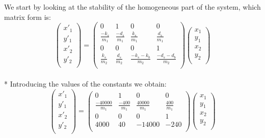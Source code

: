 \documentclass[a4paper]{article}
\begin{document}
We start by looking at the stability of the homogeneous part of the system,
which matrix form is:
\begin{equation}\label{matrix_form}
  \begin{pmatrix} 
    x'_1 \\
    y'_1 \\
    x'_2 \\
    y'_2\\
  \end{pmatrix}
  =
  \begin{pmatrix} 
    0 & 1 & 0 & 0 \\
    \frac{-k_s}{m_1} & \frac{-d_s}{m_1} & \frac{k_s}{m_1} & \frac{d_s}{m_1} \\
    0 & 0 & 0 & 1\\
    \frac{k_s}{m_2} & \frac{d_s}{m_2} & \frac{-k_s-k_b}{m_2}&\frac{-d_s-d_b}{m_2}\\
  \end{pmatrix}
  \begin{pmatrix} 
    x_1 \\
    y_1 \\
    x_2 \\
    y_2\\
  \end{pmatrix}
\end{equation}
\\*
Introducing the values of the constants we obtain:
\begin{equation}
  \begin{pmatrix} 
    x'_1 \\
    y'_1 \\
    x'_2 \\
    y'_2\\
  \end{pmatrix}
  =
  \begin{pmatrix} 
    0 & 1 & 0 & 0 \\
    \frac{-40000}{m_1} & \frac{-400}{m_1} & \frac{40000}{m_1} & \frac{400}{m_1} \\
    0 & 0 & 0 & 1\\
    4000 & 40 & -14000 & -240 \\
  \end{pmatrix}
  \begin{pmatrix} 
    x_1 \\
    y_1 \\
    x_2 \\
    y_2\\
  \end{pmatrix}
\end{equation}
\end{document}
